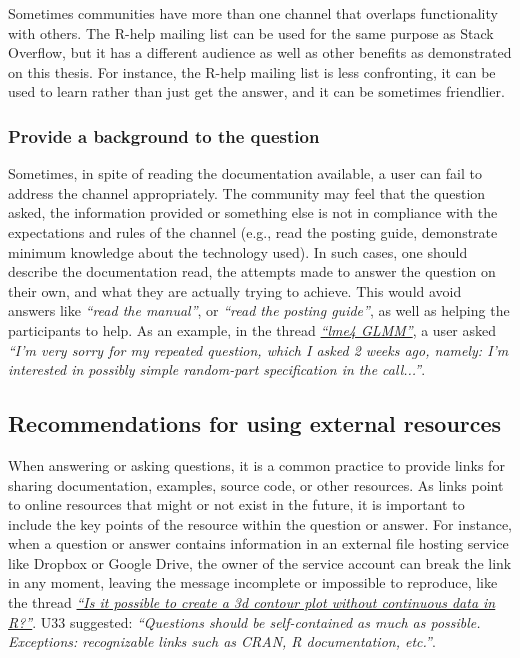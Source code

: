 \documentclass{sig-alternate-05-2015}
\begin{document}
		Sometimes communities have more than one channel that overlaps functionality with others.
		The R-help mailing list can be used for the same purpose as Stack Overflow, but it has a different audience as well as other benefits as demonstrated on this thesis.
		For instance, the R-help mailing list is less confronting, it can be used to learn rather than just get the answer, and it can be sometimes friendlier.

	\subsubsection{Provide a background to the question}

        Sometimes, in spite of reading the documentation available, a user can fail to address the channel appropriately. 
        The community may feel that the question asked, the information provided or something else is not in compliance with the expectations and rules of the channel (e.g., read the posting guide, demonstrate minimum knowledge about the technology used).
		In such cases, one should describe the documentation read, the attempts made to answer the question on their own, and what they are actually trying to achieve.
		This would avoid answers like \textit{``read the manual''}, or \textit{``read the posting guide''}, as well as helping the participants to help.
		As an example, in the thread \textit{\href{https://goo.gl/Gbek3R}{``lme4 GLMM''}}, a user asked \textit{``I'm very sorry for my repeated question, which I asked 2 weeks ago, namely: I'm interested in possibly simple random-part specification in the call...''}.

\subsection{Recommendations for using external resources}

	When answering or asking questions, it is a common practice to provide links for sharing documentation, examples, source code, or other resources.
	As links point to online resources that might or not exist in the future, it is important to include the key points of the resource within the question or answer.
	For instance, when a question or answer contains information in an external file hosting service like Dropbox or Google Drive, the owner of the service account can break the link in any moment, leaving the message incomplete or impossible to reproduce, like the thread \textit{\href{http://goo.gl/5nanFU}{``Is it possible to create a 3d contour plot without continuous data in R?''}}.
	U33 suggested: \textit{``Questions should be self-contained as much as possible. Exceptions: recognizable links such as CRAN, R documentation, etc.''}.
\end{document}
